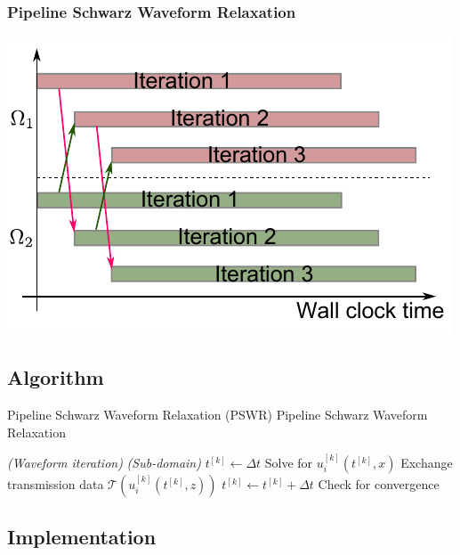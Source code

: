 \documentclass[]{beamer}
\begin{document}
\begin{frame}
  \frametitle{Pipeline Schwarz Waveform Relaxation}
  \centering
  \includegraphics[height=0.7\textheight]{figures/pswr}
\end{frame}


\subsection{Algorithm}

\begin{frame}{Pipeline Schwarz Waveform Relaxation (PSWR)}
  {Pipeline Schwarz Waveform Relaxation}

    \begin{algorithmic}
    \textit{ (Waveform iteration)}
       \textit{ (Sub-domain)}
        \State $t^{[k]} \gets \Delta t$
            \State Solve for $u_i^{[k]}(t^{[k]},x)$
            \State Exchange transmission data $\mathcal{T}(u_i^{[k]}(t^{[k]}, z))$
            \State $t^{[k]} \gets t^{[k]} + \Delta t$
          \EndRedIf
        \EndWhile
      \EndParFor
      \State Check for convergence          
    \EndRedParFor
  \end{algorithmic}

\end{frame}


\subsection{Implementation}
\end{document}
